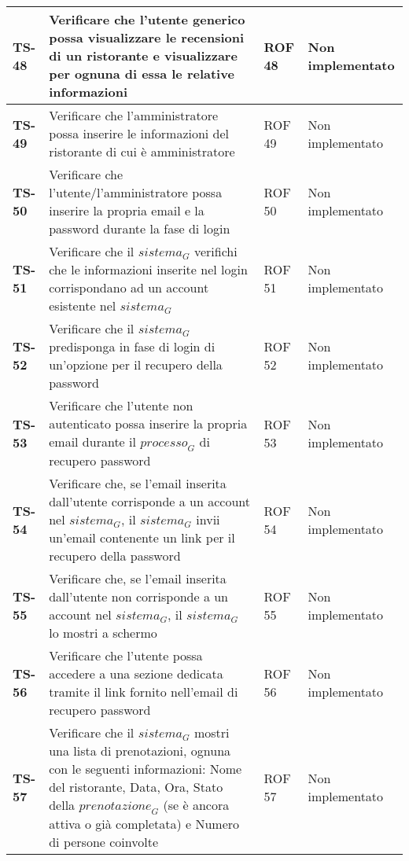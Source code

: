 \begin{longtable}{|>{\centering\arraybackslash}p{1.5cm}|p{9.8cm}|p{2cm}|p{3.5cm}|}
    \hline
    \rowcolor{gray!10}
    \textbf{TS-48} & Verificare che l'utente generico possa visualizzare le recensioni di un ristorante e visualizzare per ognuna di essa le relative informazioni & ROF 48 & Non implementato \\ 
    \hline
    \rowcolor{gray!10}
    \textbf{TS-49} & Verificare che l'amministratore possa inserire le informazioni del ristorante di cui è amministratore & ROF 49 & Non implementato \\
    \hline
    \rowcolor{gray!10}
    \textbf{TS-50} & Verificare che l'utente/l'amministratore possa inserire la propria email e la password durante la fase di login & ROF 50 & Non implementato \\ 
    \hline
    \rowcolor{gray!10}
    \textbf{TS-51} & Verificare che il $\textit{sistema}_G$ verifichi che le informazioni inserite nel login corrispondano ad un account esistente nel $\textit{sistema}_G$ & ROF 51 & Non implementato \\ 
    \hline
    \rowcolor{gray!10}
    \textbf{TS-52} & Verificare che il $\textit{sistema}_G$ predisponga in fase di login di un'opzione per il recupero della password & ROF 52 & Non implementato \\ 
    \hline
    \rowcolor{gray!10}
    \textbf{TS-53} & Verificare che l'utente non autenticato possa inserire la propria email durante il $\textit{processo}_G$ di recupero password & ROF 53 & Non implementato \\ 
    \hline
    \rowcolor{gray!10}
    \textbf{TS-54} & Verificare che, se l'email inserita dall'utente corrisponde a un account nel $\textit{sistema}_G$, il $\textit{sistema}_G$ invii un'email contenente un link per il recupero della password & ROF 54 & Non implementato \\
    \hline
    \rowcolor{gray!10}
    \textbf{TS-55} & Verificare che, se l'email inserita dall'utente non corrisponde a un account nel $\textit{sistema}_G$, il $\textit{sistema}_G$ lo mostri a schermo & ROF 55 & Non implementato \\ 
    \hline
    \rowcolor{gray!10}
    \textbf{TS-56} & Verificare che l'utente possa accedere a una sezione dedicata tramite il link fornito nell'email di recupero password & ROF 56 & Non implementato \\ 
    \hline
    \rowcolor{gray!10}
    \textbf{TS-57} & Verificare che il $\textit{sistema}_G$ mostri una lista di prenotazioni, ognuna con le seguenti informazioni:
    Nome del ristorante, Data, Ora, Stato della $\textit{prenotazione}_G$ (se è ancora attiva o già completata) e Numero di persone coinvolte & ROF 57 & Non implementato \\

\end{longtable}
